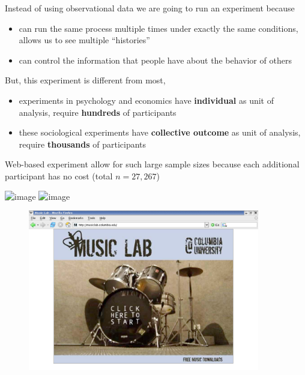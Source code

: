 \documentclass[aspectratio=169]{beamer}
\begin{document}
\begin{frame}

Instead of using observational data we are going to run an experiment because
\begin{itemize}
\item can run the same process multiple times under exactly the same conditions, allows us to see multiple ``histories''
\item can control the information that people have about the behavior of others
\end{itemize}

\pause
\vspace{0.2in}
But, this experiment is different from most,
\begin{itemize}
\item experiments in psychology and economics have \textbf{individual} as unit of analysis, require \textbf{hundreds} of participants 
\item these sociological experiments have \textbf{collective outcome} as unit of analysis, require \textbf{thousands} of participants
\end{itemize}
Web-based experiment allow for such large sample sizes because each additional participant has no cost (total $n= 27,267$)\\

\end{frame}
\begin{frame}

\begin{center}
\includegraphics<1>[width = 0.85\textwidth]{figures/zero_variable_cost_1}
\includegraphics<2>[width = 0.85\textwidth]{figures/zero_variable_cost_2}
\end{center}

\end{frame}
\begin{frame}

\begin{figure}
  \centering
  \includegraphics[width = 0.9\textwidth]{figures/splashscreen}
\end{figure}

\end{frame}
\end{document}
